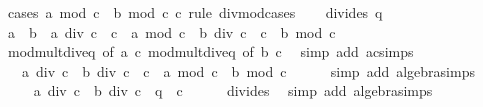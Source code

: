 \begin{isabellebody}
%
\isadelimproof
%
\endisadelimproof
%
\isatagproof
{}\isamarkupfalse%
\ {\isacharparenleft}{\kern0pt}cases\ {\isachardoublequoteopen}a\ mod\ c\ {\isacharplus}{\kern0pt}\ b\ mod\ c{\isachardoublequoteclose}\ c\ rule{\isacharcolon}{\kern0pt}\ divmod{\isacharunderscore}{\kern0pt}cases{\isacharparenright}{\kern0pt}\isanewline
\ \ \isamarkupfalse%
\ {\isacharparenleft}{\kern0pt}divides\ q{\isacharparenright}{\kern0pt}\isanewline
\ \ \isamarkupfalse%
\ {\isachardoublequoteopen}a\ {\isacharplus}{\kern0pt}\ b\ {\isacharequal}{\kern0pt}\ {\isacharparenleft}{\kern0pt}a\ div\ c\ {\isacharasterisk}{\kern0pt}\ c\ {\isacharplus}{\kern0pt}\ a\ mod\ c{\isacharparenright}{\kern0pt}\ {\isacharplus}{\kern0pt}\ {\isacharparenleft}{\kern0pt}b\ div\ c\ {\isacharasterisk}{\kern0pt}\ c\ {\isacharplus}{\kern0pt}\ b\ mod\ c{\isacharparenright}{\kern0pt}{\isachardoublequoteclose}\isanewline
\ \ \ \ \isamarkupfalse%
\ mod{\isacharunderscore}{\kern0pt}mult{\isacharunderscore}{\kern0pt}div{\isacharunderscore}{\kern0pt}eq\ {\isacharbrackleft}{\kern0pt}of\ a\ c{\isacharbrackright}{\kern0pt}\ mod{\isacharunderscore}{\kern0pt}mult{\isacharunderscore}{\kern0pt}div{\isacharunderscore}{\kern0pt}eq\ {\isacharbrackleft}{\kern0pt}of\ b\ c{\isacharbrackright}{\kern0pt}\ \isamarkupfalse%
\ {\isacharparenleft}{\kern0pt}simp\ add{\isacharcolon}{\kern0pt}\ ac{\isacharunderscore}{\kern0pt}simps{\isacharparenright}{\kern0pt}\isanewline
\ \ \isamarkupfalse%
\ \isamarkupfalse%
\ {\isachardoublequoteopen}{\isasymdots}\ {\isacharequal}{\kern0pt}\ {\isacharparenleft}{\kern0pt}a\ div\ c\ {\isacharplus}{\kern0pt}\ b\ div\ c{\isacharparenright}{\kern0pt}\ {\isacharasterisk}{\kern0pt}\ c\ {\isacharplus}{\kern0pt}\ {\isacharparenleft}{\kern0pt}a\ mod\ c\ {\isacharplus}{\kern0pt}\ b\ mod\ c{\isacharparenright}{\kern0pt}{\isachardoublequoteclose}\isanewline
\ \ \ \ \isamarkupfalse%
\ {\isacharparenleft}{\kern0pt}simp\ add{\isacharcolon}{\kern0pt}\ algebra{\isacharunderscore}{\kern0pt}simps{\isacharparenright}{\kern0pt}\isanewline
\ \ \isamarkupfalse%
\ \isamarkupfalse%
\ {\isachardoublequoteopen}{\isasymdots}\ {\isacharequal}{\kern0pt}\ {\isacharparenleft}{\kern0pt}a\ div\ c\ {\isacharplus}{\kern0pt}\ b\ div\ c\ {\isacharplus}{\kern0pt}\ q{\isacharparenright}{\kern0pt}\ {\isacharasterisk}{\kern0pt}\ c{\isachardoublequoteclose}\isanewline
\ \ \ \ \isamarkupfalse%
\ divides\ \isamarkupfalse%
\ {\isacharparenleft}{\kern0pt}simp\ add{\isacharcolon}{\kern0pt}\ algebra{\isacharunderscore}{\kern0pt}simps{\isacharparenright}{\kern0pt}\isanewline

\end{isabellebody}
